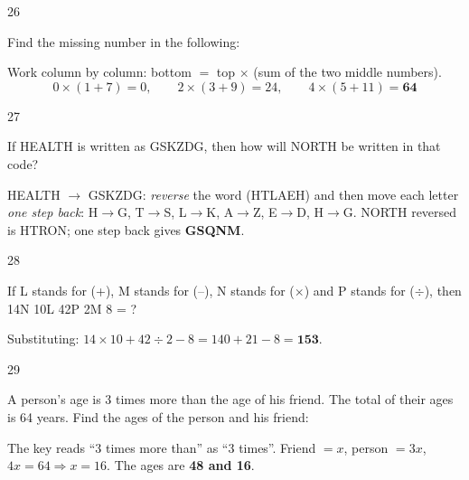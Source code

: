\begin{question}{26}
{Find the missing number in the following:\par}
\begin{explain}
Work column by column: bottom $=$ top $\times$ (sum of the two middle numbers).
\[0\times(1+7)=0,\qquad 2\times(3+9)=24,\qquad 4\times(5+11)=\mathbf{64}\]
\end{explain}
\end{question}

\begin{question}{27}
{If HEALTH is written as GSKZDG, then how will NORTH be written in that code?\par}
\begin{explain}
HEALTH $\rightarrow$ GSKZDG: \emph{reverse} the word (HTLAEH) and then move each letter \emph{one step back}: H$\rightarrow$G, T$\rightarrow$S, L$\rightarrow$K, A$\rightarrow$Z, E$\rightarrow$D, H$\rightarrow$G.
NORTH reversed is HTRON; one step back gives \textbf{GSQNM}.
\end{explain}
\end{question}

\begin{question}{28}
{If L stands for (+), M stands for (--), N stands for ($\times$) and P stands for ($\div$), then 14N 10L 42P 2M 8 = ?\par}
\begin{explain}
Substituting: $14\times10+42\div2-8=140+21-8=\mathbf{153}$.
\end{explain}
\end{question}

\begin{question}{29}
{A person's age is 3 times more than the age of his friend. The total of their ages is 64 years. Find the ages of the person and his friend:\par}
\begin{explain}
The key reads ``3 times more than'' as ``3 times''. Friend $=x$, person $=3x$, $4x=64\Rightarrow x=16$. The ages are \textbf{48 and 16}.
\end{explain}
\end{question}

